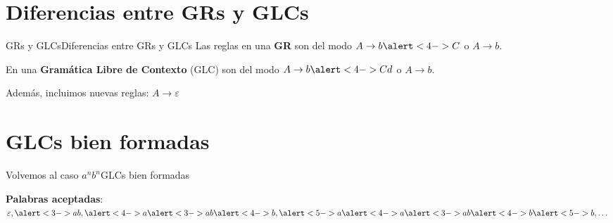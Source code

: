 \documentclass[spanish, handout]{beamer}
\begin{document}
\section{Diferencias entre GRs y GLCs}

\begin{frame}{GRs y GLCs}{Diferencias entre GRs y GLCs}
    Las \alert{reglas} en una \textbf{GR} son del modo $A \to b\alert<4->{C}$ o $A \to b$. \pause

    \bigskip

    En una \textbf{Gramática Libre de Contexto} (GLC) son del modo $A \to b\alert<4->{C}d$ o $A \to b$. \pause

    \bigskip

    Además, incluimos nuevas reglas: $A \to \varepsilon$ \pause
\end{frame}

\section{GLCs bien formadas}

\begin{frame}{Volvemos al caso $a^nb^n$}{GLCs bien formadas}

    \textbf{Palabras aceptadas}: $\varepsilon, \alert<3->{ab}, \alert<4->{a}\alert<3->{ab}\alert<4->{b}, \alert<5->a\alert<4->{a}\alert<3->{ab}\alert<4->{b}\alert<5->{b}, \dots$ \pause

    \bigskip



    \bigskip

    
\end{frame}
\end{document}
